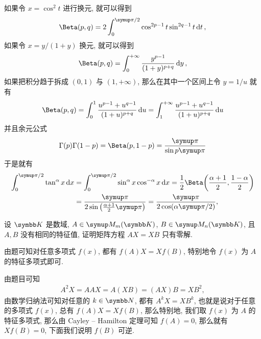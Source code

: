 \begin{exercise}[series=exer]
\begin{answer}
      如果令 $ x = \cos^{2} t $ 进行换元, 就可以得到
      \begin{align*}
          \Beta(p, q) = 2 \int_{0}^{\pi/2} \cos^{2p - 1}t \sin^{2q-1} t \dd{t},
      \end{align*}
      如果令 $ x = y/(1 + y) $ 换元, 就可以得到
      \begin{align*}
          \Beta(p, q) = \int_{0}^{+\infty} \frac{y^{p - 1}}{(1 + y)^{p + q}} \dd{y},
      \end{align*}
      如果把积分趋于拆成 $ (0, 1) $ 与 $ (1, +\infty) $, 那么在其中一个区间上令 $ y = 1/u $ 就有
      \begin{align*}
          \Beta(p, q) = \int_{0}^{1} \frac{u^{p - 1} + u^{q - 1}}{(1 + u)^{p + q}} \dd{u} = \int_{1}^{+\infty} \frac{u^{p - 1} + u^{q - 1}}{(1 + u)^{p + q}} \dd{u}
      \end{align*}
      并且余元公式
      \begin{align*}
          \Gamma(p)\Gamma(1 - p) = \Beta(p, 1 - p) = \frac{\pi}{\sin p\pi}
      \end{align*}
      于是就有
      \begin{align*}
          \int_{0}^{\pi/2} \tan^{\alpha}x \dx* & = \int_{0}^{\pi/2} \sin^{\alpha}x\cos^{-\alpha}x \dx* = \frac{1}{2}\Beta\qty(\frac{\alpha + 1}{2}, \frac{1 - \alpha}{2}) \\
                                                  & = \frac{\pi}{2\sin\qty(\frac{\alpha + 1}{2}\pi)} = \frac{\pi}{2\cos(\alpha\pi/2)},
      \end{align*}
  \end{answer}
  \sitem\label{item:AX=XB} 设 $ \K $ 是数域, $ A \in \MM[\K][m] $, $ B \in \MM[\K][n] $, 且 $ A, B $ 没有相同的特征值, 证明矩阵方程 $ AX = XB $ 只有零解.
  \begin{hint}
      由题可知对任意多项式 $ f(x) $, 都有 $ f(A)X = Xf(B) $, 特别地令 $ f(x) $ 为 $ A $ 的特征多项式即可.
  \end{hint}
  \begin{answer}
      由题目可知
      \begin{align*}
          A^{2}X = AAX = A(XB) = (AX)B = XB^{2},
      \end{align*}
      由数学归纳法可知对任意的 $ k \in \N $, 都有 $ A^{k}X = XB^{k} $, 也就是说对于任意的多项式 $ f(x) $, 总有 $ f(A)X = Xf(B) $, 那么特别地, 我们取 $ f(x) $ 为 $ A $ 的特征多项式, 那么由 Cayley -- Hamilton 定理可知 $ f(A) = 0 $, 那么就有 $ Xf(B) = 0 $, 下面我们说明 $ f(B) $ 可逆.


\end{answer}
\end{exercise}
